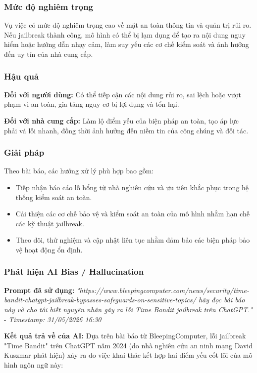\subsubsection{Mức độ nghiêm trọng}
Vụ việc có mức độ nghiêm trọng cao về mặt an toàn thông tin và quản trị rủi ro. Nếu jailbreak thành công, mô hình có thể bị lạm dụng để tạo ra nội dung nguy hiểm hoặc hướng dẫn nhạy cảm, làm suy yếu các cơ chế kiểm soát và ảnh hưởng đến uy tín của nhà cung cấp.

\subsubsection{Hậu quả}
\textbf{Đối với người dùng:} Có thể tiếp cận các nội dung rủi ro, sai lệch hoặc vượt phạm vi an toàn, gia tăng nguy cơ bị lợi dụng và tổn hại.

\textbf{Đối với nhà cung cấp:} Làm lộ điểm yếu của biện pháp an toàn, tạo áp lực phải vá lỗi nhanh, đồng thời ảnh hưởng đến niềm tin của công chúng và đối tác.

\subsubsection{Giải pháp}
Theo bài báo, các hướng xử lý phù hợp bao gồm:

\begin{itemize}
    \item Tiếp nhận báo cáo lỗ hổng từ nhà nghiên cứu và ưu tiên khắc phục trong hệ thống kiểm soát an toàn.
    \item Cải thiện các cơ chế bảo vệ và kiểm soát an toàn của mô hình nhằm hạn chế các kỹ thuật jailbreak.
    \item Theo dõi, thử nghiệm và cập nhật liên tục nhằm đảm bảo các biện pháp bảo vệ hoạt động ổn định.
\end{itemize}

\subsubsection{Phát hiện AI Bias / Hallucination}
\textbf{Prompt đã sử dụng:} \textit{"{https://www.bleepingcomputer.com/news/security/time-bandit-chatgpt-jailbreak-bypasses-safeguards-on-sensitive-topics/} hãy đọc bài báo này và cho tôi biết nguyên nhân gây ra lỗi Time Bandit jailbreak trên ChatGPT."} - \textit{Timestamp: 31/05/2026 16:30}

\textbf{Kết quả trả về của AI:}
Dựa trên bài báo từ BleepingComputer, lỗi jailbreak "Time Bandit" trên ChatGPT năm 2024 (do nhà nghiên cứu an ninh mạng David Kuszmar phát hiện) xảy ra do việc khai thác kết hợp hai điểm yếu cốt lõi của mô hình ngôn ngữ này:

